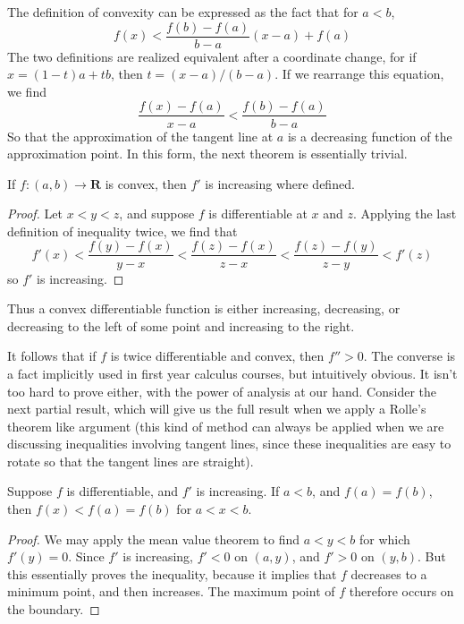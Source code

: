 The definition of convexity can be expressed as the fact that for $a < b$,
%
\[ f(x) < \frac{f(b) - f(a)}{b - a} (x - a) + f(a) \]
%
The two definitions are realized equivalent after a coordinate change, for if $x = (1-t)a + tb$, then $t = (x - a)/(b-a)$. If we rearrange this equation, we find
%
\[ \frac{f(x) - f(a)}{x - a} < \frac{f(b) - f(a)}{b - a} \]
%
So that the approximation of the tangent line at $a$ is a decreasing function of the approximation point. In this form, the next theorem is essentially trivial.

\begin{theorem}
    If $f:(a,b) \to \mathbf{R}$ is convex, then $f'$ is increasing where defined.
\end{theorem}
\begin{proof}
    Let $x < y < z$, and suppose $f$ is differentiable at $x$ and $z$. Applying the last definition of inequality twice, we find that
    \[ f'(x) < \frac{f(y) - f(x)}{y - x} < \frac{f(z) - f(x)}{z - x} < \frac{f(z) - f(y)}{z - y} < f'(z) \]
    so $f'$ is increasing.
\end{proof}

Thus a convex differentiable function is either increasing, decreasing, or decreasing to the left of some point and increasing to the right.

It follows that if $f$ is twice differentiable and convex, then $f'' > 0$. The converse is a fact implicitly used in first year calculus courses, but intuitively obvious. It isn't too hard to prove either, with the power of analysis at our hand. Consider the next partial result, which will give us the full result when we apply a Rolle's theorem like argument (this kind of method can always be applied when we are discussing inequalities involving tangent lines, since these inequalities are easy to rotate so that the tangent lines are straight).

\begin{theorem}
    Suppose $f$ is differentiable, and $f'$ is increasing. If $a < b$, and $f(a) = f(b)$, then $f(x) < f(a) = f(b)$ for $a < x < b$.
\end{theorem}
\begin{proof}
    We may apply the mean value theorem to find $a < y < b$ for which $f'(y) = 0$. Since $f'$ is increasing, $f' < 0$ on $(a,y)$, and $f' > 0$ on $(y,b)$. But this essentially proves the inequality, because it implies that $f$ decreases to a minimum point, and then increases. The maximum point of $f$ therefore occurs on the boundary.
\end{proof}

